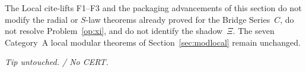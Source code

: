 \begin{remark}\label{rem:localadv-scope}
The Local cite-lifts F1--F3 and the packaging advancements of this section do not modify the radial or $S$-law theorems already proved for the Bridge Series~$C$, do not resolve Problem~\ref{op:xi}, and do not identify the shadow~$\Xi$. The seven Category~A local modular theorems of Section~\ref{sec:modlocal} remain unchanged.
\end{remark}

\noindent\textit{Tip untouched. / No CERT.}
